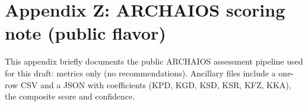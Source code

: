 \section*{Appendix Z: ARCHAIOS scoring note (public flavor)}
This appendix briefly documents the public ARCHAIOS assessment pipeline used for this draft:
metrics only (no recommendations). Ancillary files include a one-row CSV and a JSON
with coefficients (KPD, KGD, KSD, KSR, KFZ, KKA), the composite score and confidence.
